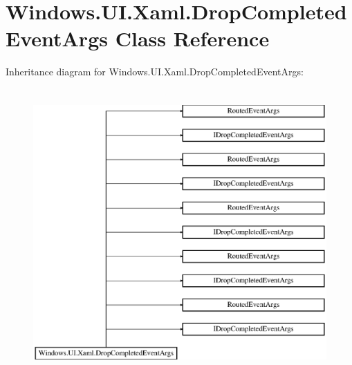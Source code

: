 \hypertarget{class_windows_1_1_u_i_1_1_xaml_1_1_drop_completed_event_args}{}\section{Windows.\+U\+I.\+Xaml.\+Drop\+Completed\+Event\+Args Class Reference}
\label{class_windows_1_1_u_i_1_1_xaml_1_1_drop_completed_event_args}
Inheritance diagram for Windows.\+U\+I.\+Xaml.\+Drop\+Completed\+Event\+Args\+:\begin{figure}[H]
\begin{center}
\leavevmode
\includegraphics[height=11.000000cm]{class_windows_1_1_u_i_1_1_xaml_1_1_drop_completed_event_args}
\end{center}
\end{figure}
